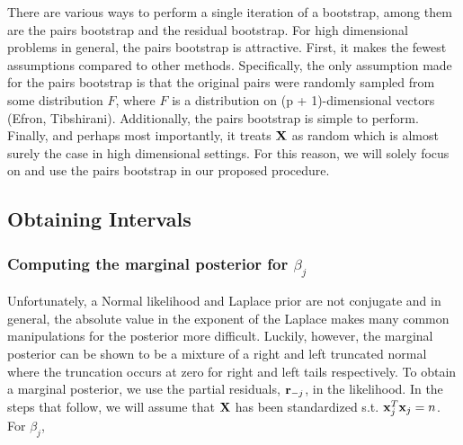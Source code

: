 There are various ways to perform a single iteration of a bootstrap, among them are the pairs bootstrap and the residual bootstrap. For high dimensional problems in general, the pairs bootstrap is attractive. First, it makes the fewest assumptions compared to other methods. Specifically, the only assumption made for the pairs bootstrap is that the original pairs were randomly sampled from some distribution $F$, where $F$ is a distribution on (p + 1)-dimensional vectors (Efron, Tibshirani). Additionally, the pairs bootstrap is simple to perform. Finally, and perhaps most importantly, it treats $\mathbf{X}$ as random which is almost surely the case in high dimensional settings. For this reason, we will solely focus on and use the pairs bootstrap in our proposed procedure.

\subsection{Obtaining Intervals}

\subsubsection{Computing the marginal posterior for \texorpdfstring{$\beta_j$}{betaj}}


Unfortunately, a Normal likelihood and Laplace prior are not conjugate and in general, the absolute value in the exponent of the Laplace makes many common manipulations for the posterior more difficult. Luckily, however, the marginal posterior can be shown to be a mixture of a right and left truncated normal where the truncation occurs at zero for right and left tails respectively. To obtain a marginal posterior, we use the partial residuals, $\mathbf{r}_{-j}$, in the likelihood. In the steps that follow, we will assume that $\mathbf{X}$ has been standardized s.t. $\mathbf{x}_j^T\mathbf{x}_j = n$. For $\beta_j$,

